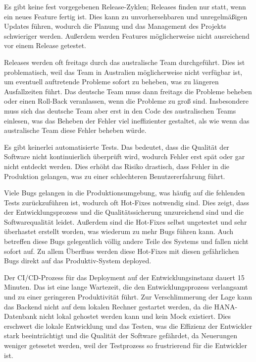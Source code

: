 Es gibt keine fest vorgegebenen Release-Zyklen; Releases finden nur statt, 
wenn ein neues Feature fertig ist. Dies kann zu unvorhersehbaren und unregelmäßigen Updates führen,
wodurch die Planung und das Management des Projekts schwieriger werden.
Außerdem werden Features möglicherweise nicht ausreichend vor einem Release getestet.

Releases werden oft freitags durch das australische Team durchgeführt. 
Dies ist problematisch, weil das Team in Australien möglicherweise nicht verfügbar ist, 
um eventuell auftretende Probleme sofort zu beheben, was zu längeren Ausfallzeiten führt. 
Das deutsche Team muss dann freitags die Probleme beheben oder einen Roll-Back veranlassen, 
wenn die Probleme zu groß sind. Insbesondere muss sich das deutsche Team aber erst 
in den Code des australischen Teams einlesen, was das Beheben der Fehler viel ineffizienter 
gestaltet, als wie wenn das australische Team diese Fehler beheben würde.

Es gibt keinerlei automatisierte Tests. Das bedeutet, 
dass die Qualität der Software nicht kontinuierlich überprüft wird, 
wodurch Fehler erst spät oder gar nicht entdeckt werden. Dies erhöht das Risiko drastisch, 
dass Fehler in die Produktion gelangen, was zu einer schlechteren Benutzererfahrung führt.

Viele Bugs gelangen in die Produktionsumgebung, 
was häufig auf die fehlenden Tests zurückzuführen ist, 
wodurch oft Hot-Fixes notwendig sind. Dies zeigt, 
dass der Entwicklungsprozess und die Qualitätssicherung unzureichend sind 
und die Softwarequalität leidet. Außerdem sind die Hot-Fixes selbst ungetestet 
und sehr überhastet erstellt worden, was wiederum zu mehr Bugs führen kann. 
Auch betreffen diese Bugs gelegentlich völlig andere Teile des Systems und fallen nicht sofort auf.
Zu allem Überfluss werden diese Hot-Fixes mit diesen gefährlichen Bugs direkt auf das Produktiv-System 
deployed. 

Der CI/CD-Prozess für das Deployment auf der Entwicklungsinstanz dauert 15 Minuten. 
Das ist eine lange Wartezeit, die den Entwicklungsprozess verlangsamt und zu einer geringeren Produktivität führt.
Zur Verschlimmerung der Lage kann das Backend nicht auf dem lokalen Rechner gestartet werden, 
da die HANA-Datenbank nicht lokal gehostet werden kann und kein Mock existiert. 
Dies erschwert die lokale Entwicklung und das Testen, 
was die Effizienz der Entwickler stark beeinträchtigt und die Qualität der Software gefährdet, 
da Neuerungen weniger getesetet werden, weil der Testprozess so frustrierend für die Entwickler ist.

